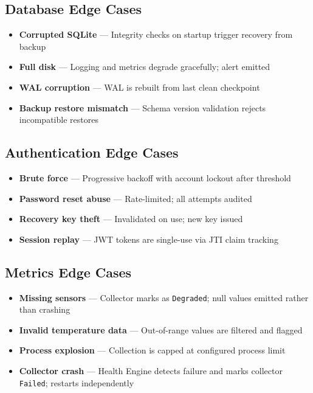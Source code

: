 \documentclass[12pt,a4paper]{article}
\begin{document}
\subsection{Database Edge Cases}

\begin{itemize}[noitemsep]
    \item \textbf{Corrupted SQLite} — Integrity checks on startup trigger recovery from backup
    \item \textbf{Full disk} — Logging and metrics degrade gracefully; alert emitted
    \item \textbf{WAL corruption} — WAL is rebuilt from last clean checkpoint
    \item \textbf{Backup restore mismatch} — Schema version validation rejects incompatible restores
\end{itemize}

\subsection{Authentication Edge Cases}

\begin{itemize}[noitemsep]
    \item \textbf{Brute force} — Progressive backoff with account lockout after threshold
    \item \textbf{Password reset abuse} — Rate-limited; all attempts audited
    \item \textbf{Recovery key theft} — Invalidated on use; new key issued
    \item \textbf{Session replay} — JWT tokens are single-use via JTI claim tracking
\end{itemize}

\subsection{Metrics Edge Cases}

\begin{itemize}[noitemsep]
    \item \textbf{Missing sensors} — Collector marks as \texttt{Degraded}; null values emitted rather than crashing
    \item \textbf{Invalid temperature data} — Out-of-range values are filtered and flagged
    \item \textbf{Process explosion} — Collection is capped at configured process limit
    \item \textbf{Collector crash} — Health Engine detects failure and marks collector \texttt{Failed}; restarts independently
\end{itemize}
\end{document}
